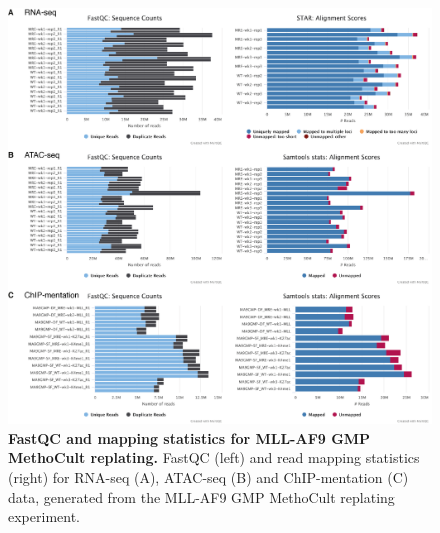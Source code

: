 \begin{figure}[p]
    \centering
    \includegraphics[width=\textwidth,height=\textheight,keepaspectratio]{figures/appendix/app_methocult-QC.png}
    \caption[{FastQC and mapping statistics for MLL-AF9 GMP MethoCult replating.}]
    {\textbf{FastQC and mapping statistics for MLL-AF9 GMP MethoCult replating.} 
    FastQC (left) and read mapping statistics (right) for RNA-seq (A), ATAC-seq (B) and ChIP-mentation (C) data, generated from the MLL-AF9 GMP MethoCult replating experiment. 
    }
    \label{fig:app_methocult-qc}
\end{figure}
\clearpage




















